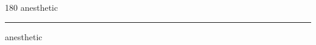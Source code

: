 
\begin{frame}
\begin{center}
\begin{turn}{180}
{\fontsize{2.5cm}{1em}\selectfont anesthetic}
\end{turn}
\vspace{1em}\par  
\hrule
\vspace{1em}\par  
{\fontsize{2.5cm}{1em}\selectfont anesthetic}
\end{center}
\end{frame}
